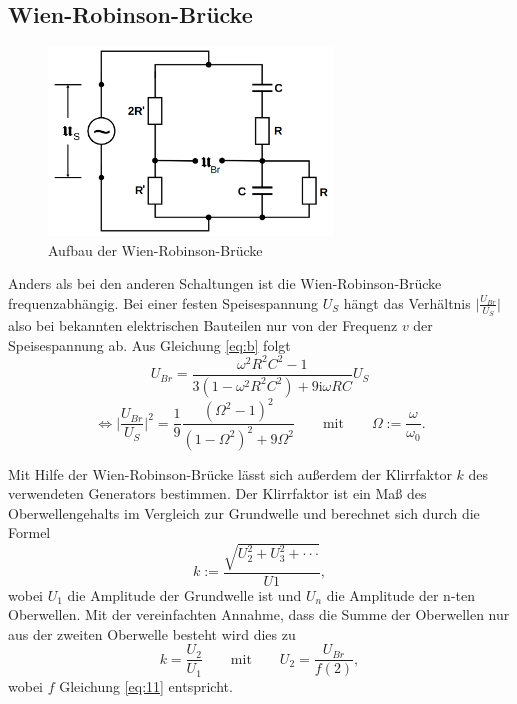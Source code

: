 \subsection{Wien-Robinson-Brücke}
\begin{figure}[H]
\centering
    \includegraphics[height= 5cm]{content/Wien-Robinson.png}
    \caption{Aufbau der Wien-Robinson-Brücke\cite[223]{sample}}
\end{figure}
\noindent Anders als bei den anderen Schaltungen ist
die Wien-Robinson-Brücke frequenzabhängig. Bei einer
festen Speisespannung $U_S$ hängt das Verhältnis
$\lvert{\frac{U_{Br}}{U_S}}\rvert$
also bei bekannten elektrischen Bauteilen
nur von der Frequenz $v$ der Speisespannung ab.
Aus Gleichung \ref{eq:b} folgt
\begin{equation}
    U_{Br}=\frac{\omega^2R^2C^2-1}{3(1-\omega^2R^2C^2)+9\text{i}\omega RC}U_S
\end{equation}
\begin{equation}
    \iff \Big|\frac{U_{Br}}{U_S}\Bigr| ^2=\frac{1}{9}\frac{(\Omega ^2 -1)^2}{(1-\Omega ^2)^2+9\Omega ^2} \qquad \text{mit} \qquad \Omega := \frac{\omega}{\omega_0}.
    \label{eq:10}
\end{equation}

\noindent Mit Hilfe der Wien-Robinson-Brücke lässt
sich außerdem der Klirrfaktor $k$ des verwendeten Generators
bestimmen. Der Klirrfaktor ist ein Maß des
Oberwellengehalts im Vergleich zur Grundwelle und berechnet
sich durch die Formel
\begin{equation}
    k:=\frac{\sqrt{U_2^2+U_3^2+\cdot \cdot \cdot }}{U1},
    \label{eq:11}
   \end{equation}
\noindent wobei $U_1$ die Amplitude der Grundwelle
ist und $U_n$ die Amplitude der n-ten Oberwellen.
Mit der vereinfachten Annahme, dass die Summe der
Oberwellen nur aus der zweiten Oberwelle besteht wird
dies zu
\begin{equation}
    k=\frac{U_2}{U_1} \qquad \text{mit} \qquad U_2=\frac{U_{Br}}{f(2)},
    \label{eq:8}
\end{equation}
\noindent wobei $f$ Gleichung \ref{eq:11} entspricht.



